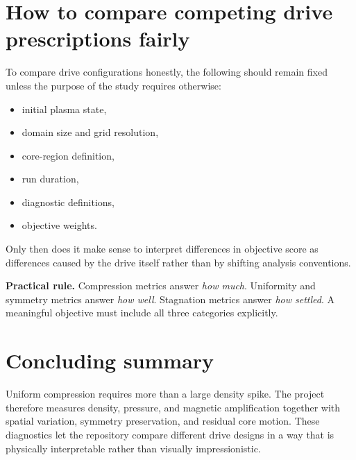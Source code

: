 \documentclass[11pt]{article}
\begin{document}
\section{How to compare competing drive prescriptions fairly}
To compare drive configurations honestly, the following should remain fixed unless the purpose of the study requires otherwise:
\begin{itemize}
    \item initial plasma state,
    \item domain size and grid resolution,
    \item core-region definition,
    \item run duration,
    \item diagnostic definitions,
    \item objective weights.
\end{itemize}

Only then does it make sense to interpret differences in objective score as differences caused by the drive itself rather than by shifting analysis conventions.

\begin{keybox}
\textbf{Practical rule.} Compression metrics answer \emph{how much}. Uniformity and symmetry metrics answer \emph{how well}. Stagnation metrics answer \emph{how settled}. A meaningful objective must include all three categories explicitly.
\end{keybox}

\section{Concluding summary}
Uniform compression requires more than a large density spike. The project therefore measures density, pressure, and magnetic amplification together with spatial variation, symmetry preservation, and residual core motion. These diagnostics let the repository compare different drive designs in a way that is physically interpretable rather than visually impressionistic.
\end{document}
